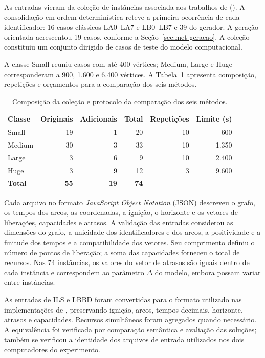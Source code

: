 As entradas vieram da coleção de instâncias associada aos trabalhos de
 (\citeyear{DelazeriRitt2024,DelazeriRitt2026}). A consolidação em ordem
determinística reteve a primeira ocorrência de cada identificador:
16 casos clássicos LA0--LA7 e LB0--LB7 e 39 do gerador. A geração orientada
acrescentou 19 casos, conforme a Seção~\ref{sec:met-geracao}.
A coleção constituiu um conjunto dirigido de casos de teste do modelo computacional.

A classe Small reuniu casos com até 400 vértices; Medium, Large e Huge
corresponderam a 900, 1.600 e 6.400 vértices. A
Tabela~\ref{tab:met-colecao} apresenta composição, repetições e orçamentos
para a comparação dos seis métodos.

\begin{table}[htbp]
\centering
\caption{Composição da coleção e protocolo da comparação dos seis métodos.}
\label{tab:met-colecao}
\normalsize
\begin{tabular}{lrrrrr}
\hline\hline
Classe & Originais & Adicionais & Total & Repetições & Limite (s) \\
\hline
Small  & 19 & 1 & 20 & 10 & 600 \\
Medium & 30 & 3 & 33 & 10 & 1.350 \\
Large  & 3 & 6 & 9 & 10 & 2.400 \\
Huge   & 3 & 9 & 12 & 3 & 9.600 \\
\textbf{Total} & \textbf{55} & \textbf{19} & \textbf{74} & -- & -- \\
\hline\hline
\end{tabular}
\par\smallskip
{\singlespacing{}}
\end{table}

Cada arquivo no formato \textit{JavaScript Object Notation} (JSON) descreveu
o grafo, os tempos dos arcos, as coordenadas, a ignição, o horizonte e os
vetores de liberações, capacidades e atrasos. A validação das entradas
considerou as dimensões do grafo, a unicidade dos identificadores e dos
arcos, a positividade e a finitude dos tempos e a compatibilidade dos vetores.
Seu comprimento definiu o número de pontos de liberação; a soma das
capacidades forneceu o total de recursos. Nas 74 instâncias, os valores do
vetor de atrasos são iguais dentro de cada instância e correspondem ao
parâmetro $\Delta$ do modelo, embora possam variar entre instâncias.

As entradas de ILS e LBBD foram convertidas para o formato utilizado nas
implementações de , preservando ignição, arcos, tempos
decimais, horizonte, atrasos e capacidades. Recursos simultâneos foram
agregados quando necessário. A equivalência foi verificada por comparação
semântica e avaliação das soluções; também se verificou a identidade dos
arquivos de entrada utilizados nos dois computadores do experimento.

